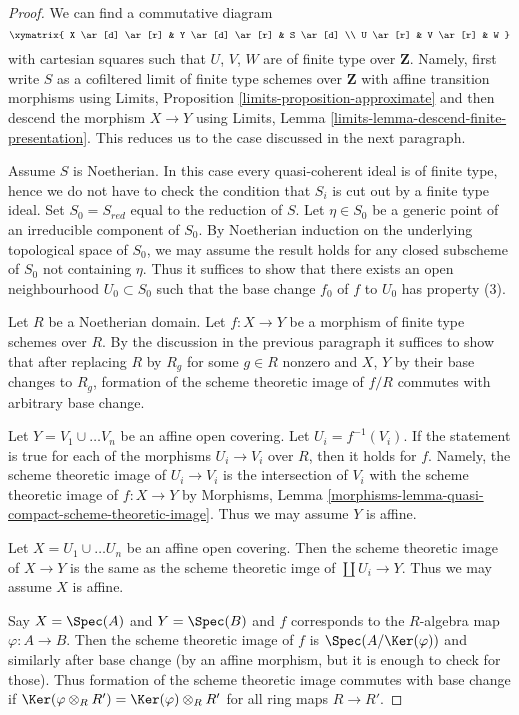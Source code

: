 \begin{proof}
We can find a commutative diagram
$$
\xymatrix{
X \ar[d] \ar[r] & Y \ar[d] \ar[r] & S \ar[d] \\
U \ar[r] & V \ar[r] & W
}
$$
with cartesian squares such that $U$, $V$, $W$
are of finite type over $\mathbf{Z}$. Namely, first write $S$
as a cofiltered limit of finite type schemes over $\mathbf{Z}$
with affine transition morphisms
using Limits, Proposition \ref{limits-proposition-approximate}
and then descend the morphism $X \to Y$ using
Limits, Lemma \ref{limits-lemma-descend-finite-presentation}.
This reduces us to the case discussed in the next paragraph.

\medskip\noindent
Assume $S$ is Noetherian.  In this case every quasi-coherent ideal
is of finite type, hence we do not have to check the condition that
$S_i$ is cut out by a finite type ideal. Set $S_0 = S_{red}$ equal
to the reduction of $S$. Let $\eta \in S_0$ be a generic point
of an irreducible component of $S_0$. By Noetherian induction on
the underlying topological space of $S_0$, we may assume the result
holds for any closed subscheme of $S_0$ not containing $\eta$.
Thus it suffices to show that there exists an open neighbourhood
$U_0 \subset S_0$ such that the base change $f_0$ of $f$ to $U_0$
has property (3).

\medskip\noindent
Let $R$ be a Noetherian domain. Let $f : X \to Y$ be a morphism
of finite type schemes over $R$. By the discussion in the previous paragraph
it suffices to show that after replacing $R$ by $R_g$ for some $g \in R$
nonzero and $X$, $Y$ by their base changes to $R_g$,
formation of the scheme theoretic image of $f/R$ commutes
with arbitrary base change.

\medskip\noindent
Let $Y = V_1 \cup \ldots V_n$ be an affine open covering.
Let $U_i = f^{-1}(V_i)$. If the statement is true for each of the
morphisms $U_i \to V_i$ over $R$, then it holds for $f$.
Namely, the scheme theoretic image of $U_i \to V_i$
is the intersection of $V_i$ with the scheme theoretic
image of $f : X \to Y$ by Morphisms, Lemma
\ref{morphisms-lemma-quasi-compact-scheme-theoretic-image}.
Thus we may assume $Y$ is affine.

\medskip\noindent
Let $X = U_1 \cup \ldots U_n$ be an affine open covering.
Then the scheme theoretic image of $X \to Y$ is the same as
the scheme theoretic imge of $\coprod U_i \to Y$.
Thus we may assume $X$ is affine.

\medskip\noindent
Say $X = \Spec(A)$ and $Y = \Spec(B)$ and $f$ corresponds
to the $R$-algebra map $\varphi : A \to B$.
Then the scheme theoretic image of $f$ is $\Spec(A/\Ker(\varphi))$
and similarly after base change (by an affine morphism, but it is
enough to check for those).
Thus formation of the scheme theoretic image commutes
with base change if $\Ker(\varphi \otimes_R R') = \Ker(\varphi) \otimes_R R'$
for all ring maps $R \to R'$.


\end{proof}
